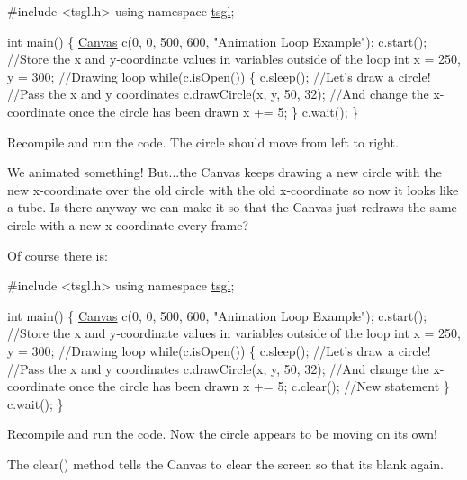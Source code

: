 \begin{DoxyCode}
\textcolor{preprocessor}{#include <tsgl.h>}
\textcolor{keyword}{using namespace }\hyperlink{namespacetsgl}{tsgl};

\textcolor{keywordtype}{int} main() \{
  \hyperlink{classtsgl_1_1_canvas}{Canvas} c(0, 0, 500, 600, \textcolor{stringliteral}{"Animation Loop Example"});
  c.start();
  \textcolor{comment}{//Store the x and y-coordinate values in variables outside of the loop}
  \textcolor{keywordtype}{int} x = 250, y = 300;
  \textcolor{comment}{//Drawing loop}
  \textcolor{keywordflow}{while}(c.isOpen()) \{
    c.sleep();
    \textcolor{comment}{//Let's draw a circle!}
    \textcolor{comment}{//Pass the x and y coordinates}
    c.drawCircle(x, y, 50, 32);
    \textcolor{comment}{//And change the x-coordinate once the circle has been drawn}
    x += 5;
  \}
  c.wait();
\}
\end{DoxyCode}
 Recompile and run the code. The circle should move from left to right.

We animated something! But...the Canvas keeps drawing a new circle with the new x-\/coordinate over the old circle with the old x-\/coordinate so now it looks like a tube. Is there anyway we can make it so that the Canvas just redraws the same circle with a new x-\/coordinate every frame?

Of course there is\+:


\begin{DoxyCode}
\textcolor{preprocessor}{#include <tsgl.h>}
\textcolor{keyword}{using namespace }\hyperlink{namespacetsgl}{tsgl};

\textcolor{keywordtype}{int} main() \{
  \hyperlink{classtsgl_1_1_canvas}{Canvas} c(0, 0, 500, 600, \textcolor{stringliteral}{"Animation Loop Example"});
  c.start();
  \textcolor{comment}{//Store the x and y-coordinate values in variables outside of the loop}
  \textcolor{keywordtype}{int} x = 250, y = 300;
  \textcolor{comment}{//Drawing loop}
  \textcolor{keywordflow}{while}(c.isOpen()) \{
    c.sleep();
    \textcolor{comment}{//Let's draw a circle!}
    \textcolor{comment}{//Pass the x and y coordinates}
    c.drawCircle(x, y, 50, 32);
    \textcolor{comment}{//And change the x-coordinate once the circle has been drawn}
    x += 5;
    c.clear(); \textcolor{comment}{//New statement}
  \}
  c.wait();
\}
\end{DoxyCode}


Recompile and run the code. Now the circle appears to be moving on its own!

The clear() method tells the Canvas to clear the screen so that its blank again.

